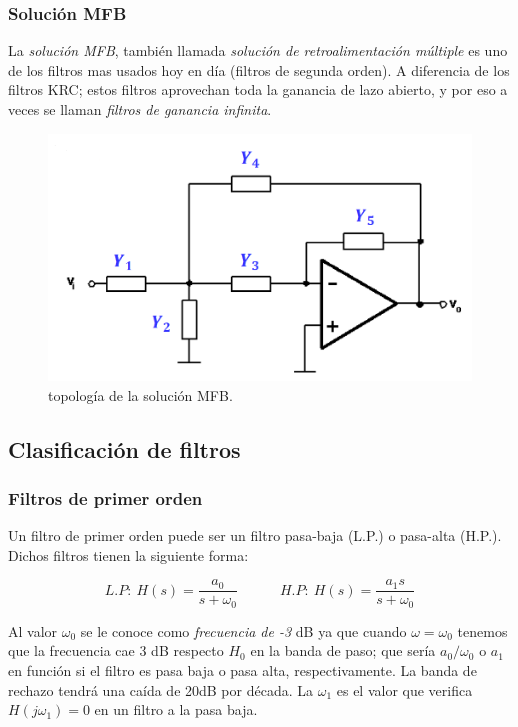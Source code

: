\documentclass[12pt,a4paper]{article}
\numberwithin{equation}{section}
\numberwithin{figure}{section}
\newcommand{\tquad}{\quad \quad \quad}
\begin{document}
\subsubsection{Solución MFB}

La \textit{solución MFB}, también llamada \textit{solución de retroalimentación múltiple} es uno de los filtros mas usados hoy en día (filtros de segunda orden). A diferencia de los filtros KRC; estos filtros aprovechan toda la ganancia de lazo abierto, y por eso a veces se llaman \textit{filtros de ganancia infinita}. 

\begin{figure}[h!] \centering
\includegraphics[scale=0.45]{2.4-MFB}
\caption{topología de la solución MFB.}
\label{Fig:2.20}
\end{figure}

\subsection{Clasificación de filtros}
\subsubsection{Filtros de primer orden}

Un filtro de primer orden puede ser un filtro pasa-baja (L.P.) o pasa-alta (H.P.). Dichos filtros tienen la siguiente forma:

\begin{equation}
L.P:  \ H(s) = \dfrac{a_0}{s+\omega_0} \tquad  
H.P:  \ H(s) = \dfrac{a_1 s}{s+\omega_0} 
\end{equation}

Al valor $\omega_0$ se le conoce como \textit{frecuencia de -3} dB ya que cuando $\omega=\omega_0$ tenemos que la frecuencia cae 3 dB respecto $H_0$ en la banda de paso; que sería $a_0/\omega_0$ o $a_1$ en función si el filtro es pasa baja o pasa alta, respectivamente. La banda de rechazo tendrá una caída de 20dB por década. La $\omega_1$ es el valor que verifica $H(j\omega_1)=0$ en un filtro a la pasa baja.
\end{document}
